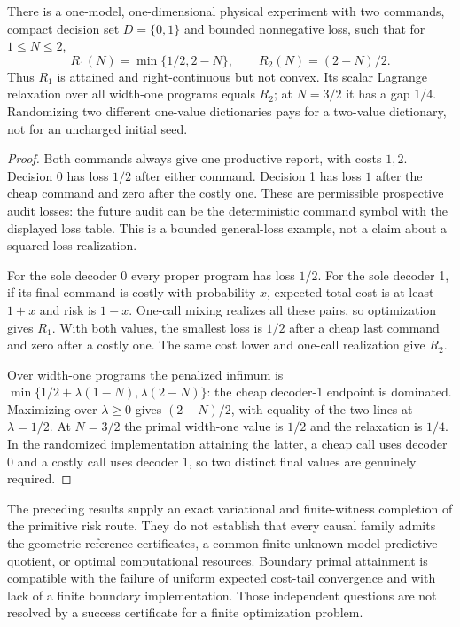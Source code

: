 \begin{proposition}\label{prop:width-dual-gap}
There is a one-model, one-dimensional physical experiment with two commands, compact decision set $D=\{0,1\}$ and bounded nonnegative loss, such that for $1\le N\le2$,
\[
 R_1(N)=\min\{1/2,2-N\},\qquad R_2(N)=(2-N)/2.
\]
Thus $R_1$ is attained and right-continuous but not convex. Its scalar Lagrange relaxation over all width-one programs equals $R_2$; at $N=3/2$ it has a gap $1/4$. Randomizing two different one-value dictionaries pays for a two-value dictionary, not for an uncharged initial seed.
\end{proposition}
\begin{proof}
Both commands always give one productive report, with costs $1,2$. Decision 0 has loss $1/2$ after either command. Decision 1 has loss $1$ after the cheap command and zero after the costly one. These are permissible prospective audit losses: the future audit can be the deterministic command symbol with the displayed loss table. This is a bounded general-loss example, not a claim about a squared-loss realization.

For the sole decoder 0 every proper program has loss $1/2$. For the sole decoder 1, if its final command is costly with probability $x$, expected total cost is at least $1+x$ and risk is $1-x$. One-call mixing realizes all these pairs, so optimization gives $R_1$. With both values, the smallest loss is $1/2$ after a cheap last command and zero after a costly one. The same cost lower and one-call realization give $R_2$.

Over width-one programs the penalized infimum is
$\min\{1/2+\lambda(1-N),\lambda(2-N)\}$: the cheap decoder-1 endpoint is dominated. Maximizing over $\lambda\ge0$ gives $(2-N)/2$, with equality of the two lines at $\lambda=1/2$. At $N=3/2$ the primal width-one value is $1/2$ and the relaxation is $1/4$. In the randomized implementation attaining the latter, a cheap call uses decoder 0 and a costly call uses decoder 1, so two distinct final values are genuinely required.
\end{proof}

The preceding results supply an exact variational and finite-witness completion of the primitive risk route. They do not establish that every causal family admits the geometric reference certificates, a common finite unknown-model predictive quotient, or optimal computational resources. Boundary primal attainment is compatible with the failure of uniform expected cost-tail convergence and with lack of a finite boundary implementation. Those independent questions are not resolved by a success certificate for a finite optimization problem.
